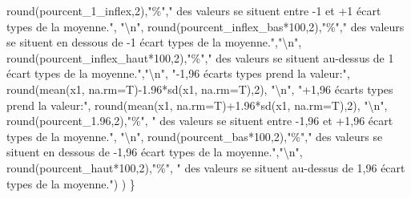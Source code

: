 \documentclass[
]{book}
\newenvironment{Shaded}{\begin{snugshade}}{\end{snugshade}}
\newcommand{\AttributeTok}[1]{\textcolor[rgb]{0.77,0.63,0.00}{#1}}
\newcommand{\DecValTok}[1]{\textcolor[rgb]{0.00,0.00,0.81}{#1}}
\newcommand{\FloatTok}[1]{\textcolor[rgb]{0.00,0.00,0.81}{#1}}
\newcommand{\FunctionTok}[1]{\textcolor[rgb]{0.00,0.00,0.00}{#1}}
\newcommand{\NormalTok}[1]{#1}
\newcommand{\SpecialCharTok}[1]{\textcolor[rgb]{0.00,0.00,0.00}{#1}}
\newcommand{\StringTok}[1]{\textcolor[rgb]{0.31,0.60,0.02}{#1}}
\begin{document}
\begin{Shaded}
\begin{Highlighting}[]
                \FunctionTok{round}\NormalTok{(pourcent\_1\_inflex,}\DecValTok{2}\NormalTok{),}\StringTok{"\%"}\NormalTok{,}\StringTok{" des valeurs se situent entre {-}1 et +1 écart types de la moyenne."}\NormalTok{, }\StringTok{"}\SpecialCharTok{\textbackslash{}n}\StringTok{"}\NormalTok{,}
                \FunctionTok{round}\NormalTok{(pourcent\_inflex\_bas}\SpecialCharTok{*}\DecValTok{100}\NormalTok{,}\DecValTok{2}\NormalTok{),}\StringTok{"\%"}\NormalTok{,}\StringTok{" des valeurs se situent en dessous de {-}1 écart types de la moyenne."}\NormalTok{,}\StringTok{"}\SpecialCharTok{\textbackslash{}n}\StringTok{"}\NormalTok{,}
                \FunctionTok{round}\NormalTok{(pourcent\_inflex\_haut}\SpecialCharTok{*}\DecValTok{100}\NormalTok{,}\DecValTok{2}\NormalTok{),}\StringTok{"\%"}\NormalTok{,}\StringTok{" des valeurs se situent au{-}dessus de 1 écart types de la moyenne."}\NormalTok{,}\StringTok{"}\SpecialCharTok{\textbackslash{}n}\StringTok{"}\NormalTok{,}
                \StringTok{"{-}1,96 écarts types prend la valeur:"}\NormalTok{, }\FunctionTok{round}\NormalTok{(}\FunctionTok{mean}\NormalTok{(x1, }\AttributeTok{na.rm=}\NormalTok{T)}\SpecialCharTok{{-}}\FloatTok{1.96}\SpecialCharTok{*}\FunctionTok{sd}\NormalTok{(x1, }\AttributeTok{na.rm=}\NormalTok{T),}\DecValTok{2}\NormalTok{), }\StringTok{"}\SpecialCharTok{\textbackslash{}n}\StringTok{"}\NormalTok{,}
                \StringTok{"+1,96 écarts types prend la valeur:"}\NormalTok{, }\FunctionTok{round}\NormalTok{(}\FunctionTok{mean}\NormalTok{(x1, }\AttributeTok{na.rm=}\NormalTok{T)}\SpecialCharTok{+}\FloatTok{1.96}\SpecialCharTok{*}\FunctionTok{sd}\NormalTok{(x1, }\AttributeTok{na.rm=}\NormalTok{T),}\DecValTok{2}\NormalTok{), }\StringTok{"}\SpecialCharTok{\textbackslash{}n}\StringTok{"}\NormalTok{,}
                \FunctionTok{round}\NormalTok{(pourcent\_1}\FloatTok{.96}\NormalTok{,}\DecValTok{2}\NormalTok{),}\StringTok{"\%"}\NormalTok{, }\StringTok{" des valeurs se situent entre {-}1,96 et +1,96 écart types de la moyenne."}\NormalTok{, }\StringTok{"}\SpecialCharTok{\textbackslash{}n}\StringTok{"}\NormalTok{,}
                \FunctionTok{round}\NormalTok{(pourcent\_bas}\SpecialCharTok{*}\DecValTok{100}\NormalTok{,}\DecValTok{2}\NormalTok{),}\StringTok{"\%"}\NormalTok{,}\StringTok{" des valeurs se situent en dessous de {-}1,96 écart types de la moyenne."}\NormalTok{,}\StringTok{"}\SpecialCharTok{\textbackslash{}n}\StringTok{"}\NormalTok{,}
                \FunctionTok{round}\NormalTok{(pourcent\_haut}\SpecialCharTok{*}\DecValTok{100}\NormalTok{,}\DecValTok{2}\NormalTok{),}\StringTok{"\%"}\NormalTok{, }\StringTok{" des valeurs se situent au{-}dessus de 1,96 écart types de la moyenne."}\NormalTok{)}
\NormalTok{  )}
\NormalTok{\}}
\end{Highlighting}
\end{Shaded}
\end{document}
